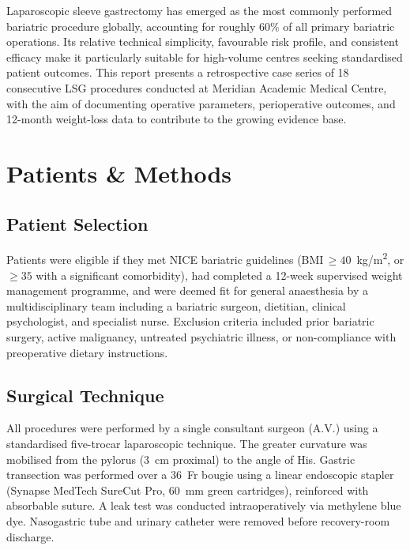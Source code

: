 \documentclass[11pt,a4paper]{article}
\begin{document}
Laparoscopic sleeve gastrectomy has emerged as the most commonly performed bariatric
procedure globally, accounting for roughly $60\%$ of all primary bariatric operations.
Its relative technical simplicity, favourable risk profile, and consistent efficacy make
it particularly suitable for high-volume centres seeking standardised patient outcomes.
This report presents a retrospective case series of 18 consecutive LSG procedures
conducted at Meridian Academic Medical Centre, with the aim of documenting operative
parameters, perioperative outcomes, and 12-month weight-loss data to contribute to the
growing evidence base.

\section{Patients \& Methods}

\subsection{Patient Selection}

Patients were eligible if they met NICE bariatric guidelines (BMI\,$\geq 40$~kg/m\textsuperscript{2},
or $\geq 35$ with a significant comorbidity), had completed a 12-week supervised weight
management programme, and were deemed fit for general anaesthesia by a multidisciplinary
team including a bariatric surgeon, dietitian, clinical psychologist, and specialist nurse.
Exclusion criteria included prior bariatric surgery, active malignancy, untreated psychiatric
illness, or non-compliance with preoperative dietary instructions.

\subsection{Surgical Technique}

All procedures were performed by a single consultant surgeon (A.V.) using a standardised
five-trocar laparoscopic technique. The greater curvature was mobilised from the pylorus
(3~cm proximal) to the angle of His. Gastric transection was performed over a 36~Fr
bougie using a linear endoscopic stapler (Synapse MedTech SureCut Pro, 60~mm green
cartridges), reinforced with absorbable suture. A leak test was conducted intraoperatively
via methylene blue dye. Nasogastric tube and urinary catheter were removed before
recovery-room discharge.
\end{document}
